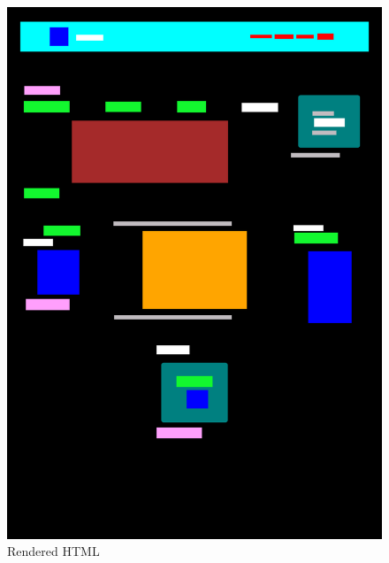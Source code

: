 \documentclass{ioereport}
\begin{document}
    \begin{figure}[H]
    \centering
    \begin{minipage}{0.35\textwidth}
        \centering
        \includegraphics[width=\linewidth]{images/sample2-rendered.png}
        \caption{Rendered HTML}
        \label{fig:s21}
    \end{minipage}\hfill
    \begin{minipage}{0.35\textwidth}
        \centering

\end{minipage}
\end{figure}
\end{document}
